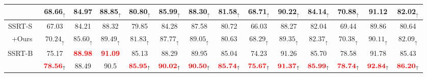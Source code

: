 \documentclass[journal]{IEEEtran}
\begin{document}
\begin{table*}[htp]
{\begin{tabular}{cccccccccccccc}
\rowcolor[gray]{0.9} \multicolumn{1}{c}{+Ours} & \multicolumn{1}{c}{68.66$_\uparrow$} & \multicolumn{1}{c}{84.97}                  & \multicolumn{1}{c}{88.85$_\uparrow$} & \multicolumn{1}{c}{80.80$_\uparrow$}                  & \multicolumn{1}{c}{85.99$_\uparrow$}                  & \multicolumn{1}{c}{88.30$_\uparrow$}                  & \multicolumn{1}{c}{81.58$_\uparrow$} & \multicolumn{1}{c}{68.71$_\uparrow$}                  & \multicolumn{1}{c}{90.22$_\uparrow$}                  & \multicolumn{1}{c}{84.14$_\uparrow$}                  & \multicolumn{1}{c}{70.88$_\uparrow$}                 & \multicolumn{1}{c}{91.12}                  & \multicolumn{1}{c}{82.02$_\uparrow$}                  \\ \hline
SSRT-S~\cite{sun2022safeSSRT} & 67.03 & 84.21 & 88.32 & 79.85 & 84.28 & 87.58 & 80.72 & 66.03 & 88.27 & 82.04 & 69.44 & 89.86 & 80.64 \\
\rowcolor[gray]{0.9}+Ours & $70.24_\uparrow$ & $85.60_\uparrow$ & $89.49_\uparrow$ & $81.83_\uparrow$ & $87.77_\uparrow$ & $89.05_\uparrow$ & 80.63 & $68.29_\uparrow$ & $89.35_\uparrow$ & $82.37_\uparrow$ & $70.38_\uparrow$ & $90.11_\uparrow$ & $82.09_\uparrow$ \\ \hline
SSRT-B~\cite{sun2022safeSSRT}  & 75.17 & \textcolor{red}{\textbf{88.98}} & \textcolor{red}{\textbf{91.09}} & 85.13 & 88.29 & 89.95 & 85.04 & 74.23 & 91.26 & 85.70 & 78.58 & 91.78 & 85.43 \\
\rowcolor[gray]{0.9} \multicolumn{1}{c}{+Ours}  & $\textcolor{red}{\textbf{78.56}}_\uparrow$ & 88.49 & 90.5 & $\textcolor{red}{\textbf{85.95}}_\uparrow$ & $\textcolor{red}{\textbf{90.02}}_\uparrow$ & $\textcolor{red}{\textbf{90.50}}_\uparrow$ & $\textcolor{red}{\textbf{85.74}}_\uparrow$ & $\textcolor{red}{\textbf{75.67}}_\uparrow$ & $\textcolor{red}{\textbf{91.37}}_\uparrow$ & $\textcolor{red}{\textbf{85.99}}_\uparrow$  & $\textcolor{red}{\textbf{78.74}}_\uparrow$ &  $\textcolor{red}{\textbf{92.84}}_\uparrow$ & $\textcolor{red}{\textbf{86.20}}_\uparrow$\\  \hline
\end{tabular}}
\label{tab:office-home}
\end{table*}
\end{document}
